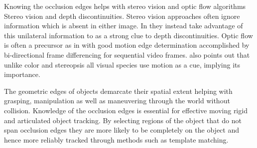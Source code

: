 \documentclass{article} %
\begin{document}
Knowing the occlusion edges helps with stereo vision and optic flow algorithms
Stereo vision and depth discontinuities.
Stereo vision approaches often ignore information which is absent in either image. In \cite{belhumeur1992bayesian} they instead take advantage of this unilateral information to as a strong clue to depth discontinuities.
Optic flow is often a precursor as in \cite{sundberg2011occlusion} with good motion edge determination accomplished by bi-directional frame differencing for sequential video frames.  \cite{sundberg2011occlusion} also points out that unlike color and stereopsis all visual species use motion as a cue, implying its importance.

\cite{klappstein2009moving}

The geometric edges of objects demarcate their spatial extent helping with grasping, manipulation as well as maneuvering through the world without collision.
Knowledge of the occlusion edges is essential for effective moving rigid and articulated object tracking.  By selecting regions of the object that do not span occlusion edges they are more likely to be completely on the object and hence more reliably tracked through methods such as template matching.

%
%
%
%
%
%
\end{document}
